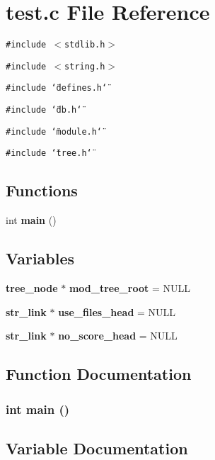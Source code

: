 \section{test.c File Reference}
\label{test_8c}
{\tt \#include $<$stdlib.h$>$}\par
{\tt \#include $<$string.h$>$}\par
{\tt \#include \char`\"{}defines.h\char`\"{}}\par
{\tt \#include \char`\"{}db.h\char`\"{}}\par
{\tt \#include \char`\"{}module.h\char`\"{}}\par
{\tt \#include \char`\"{}tree.h\char`\"{}}\par
\subsection*{Functions}
\begin{CompactItemize}
\item 
int {\bf main} ()
\end{CompactItemize}
\subsection*{Variables}
\begin{CompactItemize}
\item 
{\bf tree\_\-node} $\ast$ {\bf mod\_\-tree\_\-root} = NULL
\item 
{\bf str\_\-link} $\ast$ {\bf use\_\-files\_\-head} = NULL
\item 
{\bf str\_\-link} $\ast$ {\bf no\_\-score\_\-head} = NULL
\end{CompactItemize}


\subsection{Function Documentation}
\subsubsection{\setlength{\rightskip}{0pt plus 5cm}int main ()}\label{test_8c_a3}




\subsection{Variable Documentation}
